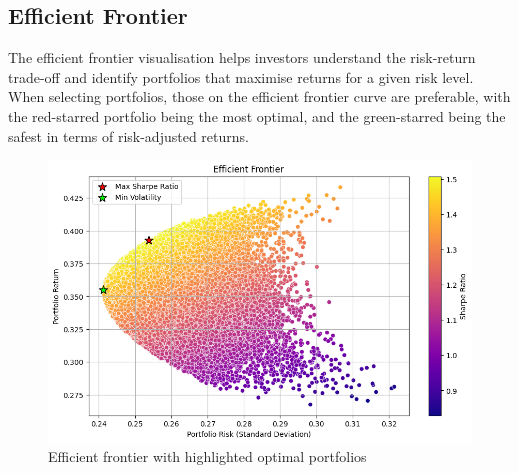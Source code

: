 \documentclass[a4paper,12pt,titlepage]{article}
\numberwithin{equation}{section}
\begin{document}
\newpage

\subsection{Efficient Frontier}

The efficient frontier visualisation helps investors understand the risk-return 
trade-off and identify portfolios that maximise returns for a given risk level. When selecting 
portfolios, those on the efficient frontier curve are preferable, with the red-starred portfolio 
being the most optimal, and the green-starred being the safest in terms of risk-adjusted returns.

\begin{figure}[htbp] %
	\centering
	\includegraphics[width=0.8\linewidth,keepaspectratio]{Plots/EfficientFrontier.png}
	\caption{Efficient frontier with highlighted optimal portfolios}
	\label{fig:figure5}
  \end{figure}
\end{document}
